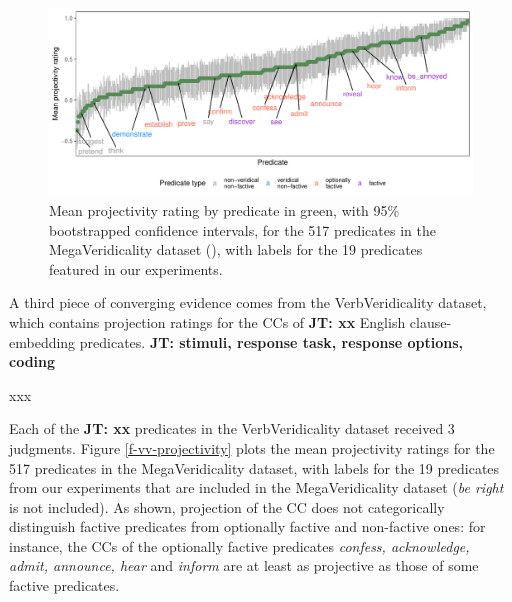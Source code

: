 \documentclass[11pt,fleqn]{article}
\newcommand{\6}{\mbox{$[\hspace*{-.6mm}[$}}
\newcommand{\9}{\mbox{$]\hspace*{-.6mm}]$}}
\newcommand{\jt}[1]{\textbf{\color{blue}JT: #1}}
\begin{document}
\begin{figure}[H]
\centering
\includegraphics[width=.77\paperwidth]{../../MegaVeridicality-analysis/graphs/means-projection-by-predicate}

\caption{Mean projectivity rating by predicate in green, with 95\% bootstrapped confidence intervals, for the 517 predicates in the MegaVeridicality dataset (\citealt{white-rawlins-nels2018,white-etal2018b}), with labels for the 19 predicates featured in our experiments.}
\label{f-white-rawlins-projectivity}
\end{figure}

A third piece of converging evidence comes from the VerbVeridicality dataset, which contains projection ratings for the CCs of \jt{xx} English clause-embedding predicates. \jt{stimuli, response task, response options, coding}

\begin{exe}
\ex\label{vv-stim-proj}
\begin{xlist}
\ex xxx
\end{xlist}
\end{exe}

Each of the \jt{xx} predicates in the VerbVeridicality dataset received 3 judgments. Figure \ref{f-vv-projectivity} plots the mean projectivity ratings for the 517 predicates in the MegaVeridicality dataset, with labels for the 19 predicates from our experiments that are included in the MegaVeridicality dataset ({\em be right} is not included). As shown, projection of the CC does not categorically distinguish factive predicates from optionally factive and non-factive ones: for instance, the CCs of the optionally factive predicates {\em confess, acknowledge, admit, announce, hear} and {\em inform} are at least as projective as those of some factive predicates. 
\end{document}
